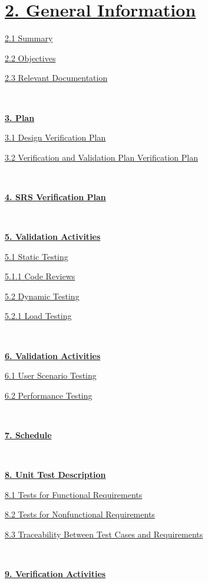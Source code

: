 \documentclass[
]{article}
\begin{document}
\hypertarget{general-information}{%
\section{\texorpdfstring{\textbf{\protect\hyperlink{Aa2}{2. General
Information}} }{2. General Information }}\label{general-information}}

\protect\hyperlink{Aa3}{2.1 Summary}

\protect\hyperlink{Aa4}{2.2 Objectives}

\protect\hyperlink{Aa5}{2.3 Relevant Documentation}

\

\protect\hyperlink{Ab1}{\textbf{3. Plan}}

\protect\hyperlink{Ab2}{3.1 Design Verification Plan}

\protect\hyperlink{Ab3}{3.2 Verification and Validation Plan
Verification Plan}

\

\protect\hyperlink{Ac}{\textbf{4. SRS Verification Plan}}

\

\protect\hyperlink{Acm}{\textbf{5. Validation Activities}}


\protect\hyperlink{Ad1}{5.1 Static Testing}

\protect\hyperlink{Ad2}{5.1.1 Code Reviews}

\protect\hyperlink{Ad3}{5.2 Dynamic Testing}

\protect\hyperlink{Ad4}{5.2.1 Load Testing}

\

\protect\hyperlink{Af}{\textbf{6. Validation Activities}}


\protect\hyperlink{Af1}{6.1 User Scenario Testing}

\protect\hyperlink{Af3}{6.2 Performance Testing}

\

\textbf{\protect\hyperlink{Amn}{7. Schedule}}


\

\textbf{\protect\hyperlink{Am}{8. Unit Test Description}}

\protect\hyperlink{Am1}{8.1 Tests for Functional Requirements}

\protect\hyperlink{Am4}{8.2 Tests for Nonfunctional Requirements}

\protect\hyperlink{Am7}{8.3 Traceability Between Test Cases and
Requirements}

\

\protect\hyperlink{Ao}{\textbf{9. Verification Activities}}
\end{document}
